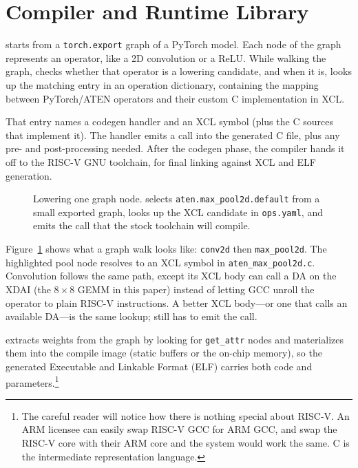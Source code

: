 
\section{Compiler and Runtime Library}
\label{sec:compiler}


\pyv{} starts from a \texttt{torch.export} graph of a {PyTorch} model.
Each node of the graph represents an operator, like a 2D convolution or a ReLU. 
While walking the graph, \pyv{} checks whether that operator is a lowering candidate,
and when it is, looks up the matching entry in an operation dictionary, containing
the mapping between PyTorch/ATEN operators and their custom {C} implementation in {XCL}.

That entry names a codegen handler and an {XCL} symbol (plus the {C} sources that implement it).
The handler emits a call into the generated {C} file, plus any pre- and post-processing needed.
After the codegen phase, the compiler hands it off to the {RISC-V} {GNU} toolchain, for final linking 
against {XCL} and {ELF} generation.

\begin{figure}[t]
  \centering
  
  \caption{Lowering one graph node.
    \pyv{} selects \texttt{aten.max\_pool2d.default} from a small
    exported graph, looks up the {XCL} candidate in \texttt{ops.yaml},
    and emits the call that the stock toolchain will compile.}
  \label{fig:pyvedas-lower}
\end{figure}

Figure~\ref{fig:pyvedas-lower} shows what a graph walk looks like:
\texttt{conv2d} then \texttt{max\_pool2d}.
The highlighted pool node resolves to an {XCL} symbol in
\texttt{aten\_max\_pool2d.c}.
Convolution follows the same path, except its {XCL} body can call a
{DA} on the {XDAI} (the $8{\times}8$ {GEMM} in this paper) instead of
letting GCC unroll the operator to plain RISC-V instructions.
A better {XCL} body---or one that calls an available {DA}---is the
same lookup; \pyv{} still has to emit the call.

\pyv{} extracts weights from the graph by looking for \texttt{get\_attr}
nodes and materializes them into the compile image (static buffers or the
on-chip memory), so the generated Executable and Linkable Format
({ELF}) carries both code and parameters.\footnote{The careful reader will notice how there is nothing special about RISC-V.
An ARM licensee can easily swap RISC-V GCC for ARM GCC, and swap the RISC-V core
with their ARM core and the system would work the same. C is the intermediate
representation language.}


